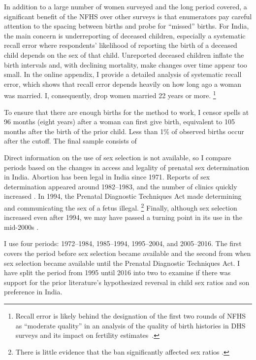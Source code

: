 \documentclass[12pt,letterpaper]{article}
\begin{document}
In addition to a large number of women surveyed and the long period covered, a significant 
benefit of the NFHS over other surveys is that enumerators pay careful attention to the 
spacing between births and probe for ``missed'' births.
For India, the main concern is underreporting of deceased children, especially a systematic 
recall error where respondents' likelihood of reporting the birth of a deceased child depends 
on the sex of that child.
Unreported deceased children inflate the birth intervals and, with declining mortality, 
make changes over time appear too small.
In the online appendix, I provide a detailed analysis of systematic recall error, which 
shows that recall error depends heavily on how long ago a woman was married. 
I, consequently, drop women married 22 years or more.%
\footnote{
Recall error is likely behind the designation of the first two rounds of NFHS as ``moderate 
quality'' in an analysis of the quality of birth histories in DHS surveys and its impact 
on fertility estimates \citep{Schoumaker2014}.
}

To ensure that there are enough births for the method to work, I censor spells at 96 
months (eight years) after a woman can first give birth, equivalent to 105 months 
after the birth of the prior child.
Less than 1\% of observed births occur after the cutoff.
The final sample consists of 


% 

Direct information on the use of sex selection is not available, so I compare periods 
based on the changes in access and legality of prenatal sex determination in India.
Abortion has been legal in India since 1971.
Reports of sex determination appeared around 1982--1983, and the number of clinics 
quickly increased \citep{Sudha1999,bhat06,Grover2006}.
In 1994, the Prenatal Diagnostic Techniques Act made determining and communicating 
the sex of a fetus illegal.%
\footnote{
There is little evidence that the ban significantly affected sex ratios \citep{Das-Gupta2016}.
}
Finally, although sex selection increased even after 1994, we may have passed a 
turning point in its use in the mid-2000s \citep{Das_Gupta2009,Kumar2012,Bongaarts2013,Diamond-Smith2015}.

I use four periods: 1972--1984, 1985--1994, 1995--2004, and 2005--2016.
The first covers the period before sex selection became available and the second from when sex 
selection became available until the Prenatal Diagnostic Techniques Act.
I have split the period from 1995 until 2016 into two to examine if there was support for 
the prior literature's hypothesized reversal in child sex ratios and son 
preference in India.
\end{document}
